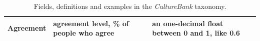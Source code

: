 \documentclass{article} %
\newcommand{\diyi}[1]{\textcolor{blue}{[#1 --diyi]}}
\newcommand{\caleb}[1]{\textcolor{aqua}{[#1 --Caleb]}}
\newcommand{\wyshi}[1]{\textcolor{red}{[#1 --Weiyan]}}
\newcommand{\dataname}{\textit{CultureBank}\xspace}
\begin{document}
\begin{table}[!tbh]
{\begin{tabular}{p{3.2cm}p{6cm}p{7cm}}
Agreement     & agreement level, \% of people who agree %
&  an one-decimal float between 0 and 1, like 0.6                                                               \\\bottomrule
\end{tabular}
}
\caption{Fields, definitions and examples in the \dataname taxonomy. 
}
\label{tab:taxonomy examples}
\end{table}

\end{document}
